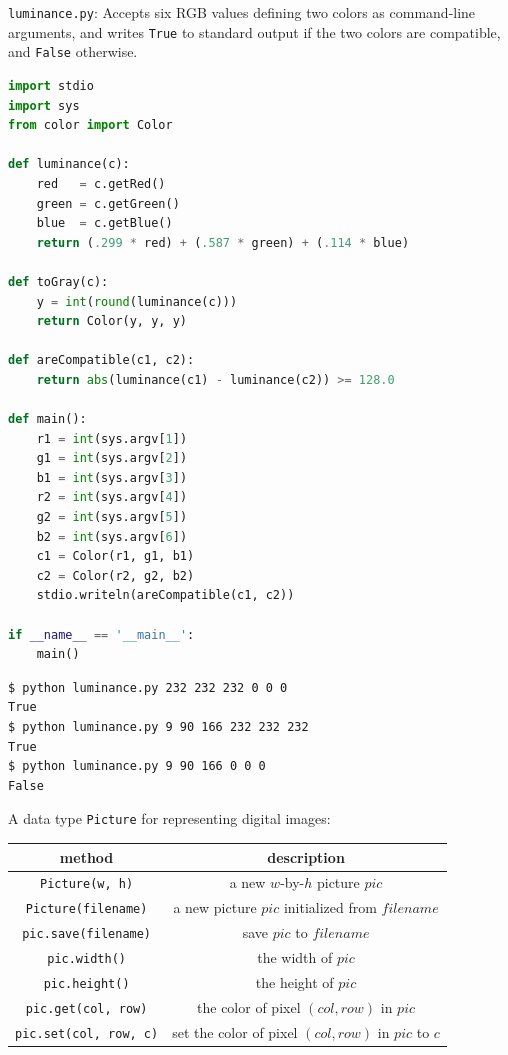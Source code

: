 \documentclass[8pt,a4paper,compress,handout]{beamer}
\begin{document}
\begin{frame}[fragile]
\begin{framed}
\tiny \lstinline{luminance.py}: Accepts six RGB values defining two colors as command-line arguments, and writes \lstinline{True} to standard output if the two colors are compatible, and \lstinline{False} otherwise.
\end{framed}

\begin{lstlisting}[language=Python]
import stdio
import sys
from color import Color

def luminance(c):
    red   = c.getRed()
    green = c.getGreen()
    blue  = c.getBlue()
    return (.299 * red) + (.587 * green) + (.114 * blue)

def toGray(c):
    y = int(round(luminance(c)))
    return Color(y, y, y)

def areCompatible(c1, c2):
    return abs(luminance(c1) - luminance(c2)) >= 128.0

def main():
    r1 = int(sys.argv[1])
    g1 = int(sys.argv[2])
    b1 = int(sys.argv[3])
    r2 = int(sys.argv[4])
    g2 = int(sys.argv[5])
    b2 = int(sys.argv[6])
    c1 = Color(r1, g1, b1)
    c2 = Color(r2, g2, b2)
    stdio.writeln(areCompatible(c1, c2))

if __name__ == '__main__':
    main()
\end{lstlisting}
\end{frame}

\begin{frame}[fragile]
\begin{lstlisting}[language={}]
$ python luminance.py 232 232 232 0 0 0
True
$ python luminance.py 9 90 166 232 232 232
True
$ python luminance.py 9 90 166 0 0 0
False
\end{lstlisting}
\end{frame}

\begin{frame}[fragile]
A data type \lstinline{Picture} for representing digital images:
\begin{center}
\begin{tabular}{cc}
method & description \\ \hline
\lstinline$Picture(w, h)$ & a new $w$-by-$h$ picture $pic$ \\
\lstinline$Picture(filename)$ & a new picture $pic$ initialized from $filename$ \\
\lstinline$pic.save(filename)$ & save $pic$ to $filename$ \\
\lstinline$pic.width()$ & the width of $pic$ \\
\lstinline$pic.height()$ & the height of $pic$ \\
\lstinline$pic.get(col, row)$ & the color of pixel $(col, row)$ in $pic$ \\
\lstinline$pic.set(col, row, c)$ & set the color of pixel $(col, row)$ in $pic$ to $c$
\end{tabular} 
\end{center}
\end{frame}
\end{document}
